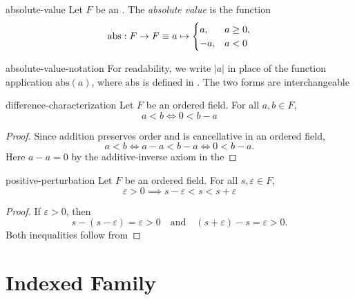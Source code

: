 \documentclass[12pt]{article}
\begin{document}
\begin{dfn}{absolute-value}
  Let \(F\) be an . The \emph{absolute value} is the function
  \[
    \mathrm{abs} : F \to F \equiv a \mapsto
    \begin{cases}
      a,  & a \geq 0, \\
      -a, & a < 0
    \end{cases}
  \]
\end{dfn}

\begin{conv}{absolute-value-notation}
  For readability, we write \(|a|\) in place of the function application \(\mathrm{abs}(a)\), where \(\mathrm{abs}\) is defined in . The two forms are interchangeable
  \par\smallskip{}
\end{conv}

\begin{lem}{difference-characterization}
  Let \(F\) be an ordered field. For all \(a,b\in F\),
  \[
    a<b\iff 0<b-a
  \]
\end{lem}

\begin{proof}
  Since addition preserves order and is cancellative in an ordered field,
  \[
    a<b
    \iff a-a<b-a
    \iff 0<b-a.
  \]
  Here \(a-a=0\) by the additive-inverse axiom in the
\end{proof}

\begin{lem}{positive-perturbation}
  Let \(F\) be an ordered field. For all \(s,\varepsilon\in F\),
  \[
    \varepsilon>0
    \implies
    s-\varepsilon<s<s+\varepsilon
  \]
\end{lem}

\begin{proof}
  If \(\varepsilon>0\), then
  \[
    s-(s-\varepsilon)=\varepsilon>0
    \quad\text{and}\quad
    (s+\varepsilon)-s=\varepsilon>0.
  \]
  Both inequalities follow from
\end{proof}

\section{Indexed Family}
\end{document}
